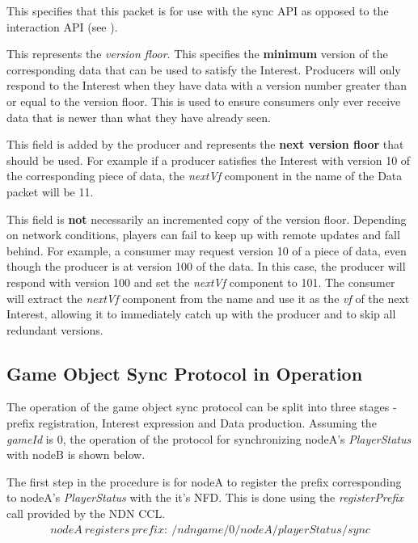 This specifies that this packet is for use with the sync API as opposed to the interaction API (see ).

This represents the \textit{version floor}. This specifies the \textbf{minimum} version of the corresponding data that can be used to satisfy the Interest. Producers will only respond to the Interest when they have data with a version number greater than or equal to the version floor. This is used to ensure consumers only ever receive data that is newer than what they have already seen.

This field is added by the producer and represents the \textbf{next version floor} that should be used. For example if a producer satisfies the Interest with version 10 of the corresponding piece of data, the \textit{nextVf} component in the name of the Data packet will be 11.

This field is \textbf{not} necessarily an incremented copy of the version floor. Depending on network conditions, players can fail to keep up with remote updates and fall behind. For example, a consumer may request version 10 of a piece of data, even though the producer is at version 100 of the data. In this case, the producer will respond with version 100 and set the \textit{nextVf} component to 101. The consumer will extract the \textit{nextVf} component from the name and use it as the \textit{vf} of the next Interest, allowing it to immediately catch up with the producer and to skip all redundant versions.


\subsection{Game Object Sync Protocol in Operation}
The operation of the game object sync protocol can be split into three stages - prefix registration, Interest expression and Data production. Assuming the \textit{gameId} is 0, the operation of the protocol for synchronizing nodeA's \textit{PlayerStatus} with nodeB is shown below.

The first step in the procedure is for nodeA to register the prefix corresponding to nodeA's \textit{PlayerStatus} with the it's NFD. This is done using the \textit{registerPrefix} call provided by the NDN CCL.
\begin{align*}
    nodeA\ registers\ prefix:\ /ndngame/0/nodeA/playerStatus/sync
\end{align*}



